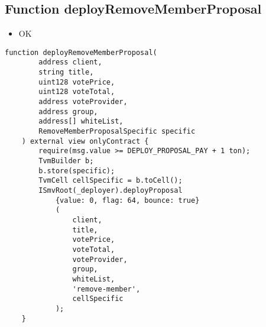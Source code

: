 \subsection{Function deployRemoveMemberProposal}

\begin{itemize}
\item OK
\end{itemize}

\begin{lstlisting}[firstnumber=46]
    function deployRemoveMemberProposal(
        address client,
        string title,
        uint128 votePrice,
        uint128 voteTotal,
        address voteProvider,
        address group,
        address[] whiteList,
        RemoveMemberProposalSpecific specific
    ) external view onlyContract {
        require(msg.value >= DEPLOY_PROPOSAL_PAY + 1 ton);
        TvmBuilder b;
        b.store(specific);
        TvmCell cellSpecific = b.toCell();
        ISmvRoot(_deployer).deployProposal
            {value: 0, flag: 64, bounce: true}
            (
                client,
                title,
                votePrice,
                voteTotal,
                voteProvider,
                group,
                whiteList,
                'remove-member',
                cellSpecific
            );
    }
\end{lstlisting}
